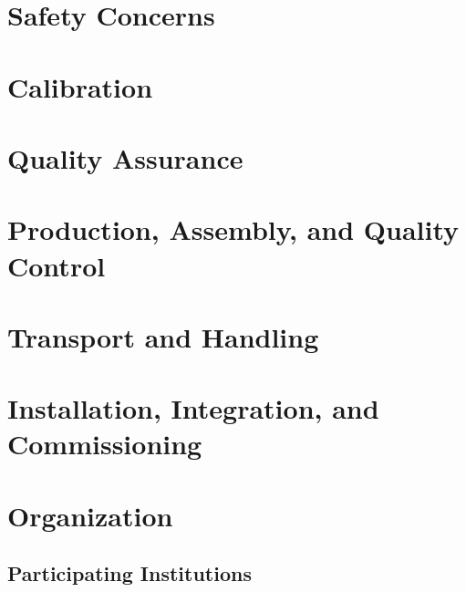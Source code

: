
\section{Safety Concerns}
\label{sec:prism-safety}

\section{Calibration}
\label{sec:prism-calib}

\section{Quality Assurance}
\label{sec:prism-qa}

\section{Production, Assembly, and Quality Control}
\label{sec:prism-qc}

\section{Transport and Handling}
\label{sec:prism-transport}

\section{Installation, Integration, and Commissioning}
\label{sec:prism-iic}

\section{Organization}
\label{sec:prism-org}

\subsection{Participating Institutions}
\label{sec:fdsp-org-inst}

